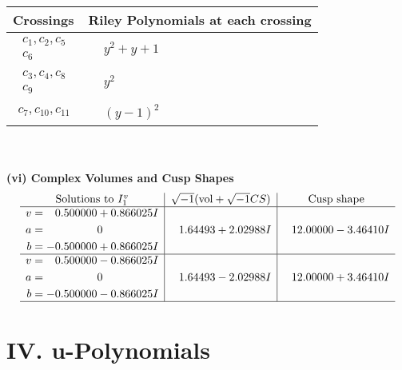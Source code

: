 \documentclass[1p]{elsarticle_modified}
\theoremstyle{definition}
\newcommand{\I}{\sqrt{-1}}
\begin{document}
\begin{tabular}{m{50pt}|m{274pt}}
Crossings & \hspace{64pt}Riley Polynomials at each crossing \\
\hline $$\begin{aligned}c_{1},c_{2},c_{5}\\c_{6}\end{aligned}$$&$\begin{aligned}
&y^2+y+1
\end{aligned}$\\
\hline $$\begin{aligned}c_{3},c_{4},c_{8}\\c_{9}\end{aligned}$$&$\begin{aligned}
&y^2
\end{aligned}$\\
\hline $$\begin{aligned}c_{7},c_{10},c_{11}\end{aligned}$$&$\begin{aligned}
&(y-1)^2
\end{aligned}$\\
\hline
\end{tabular}\\~\\
\newpage\flushleft \textbf{(vi) Complex Volumes and Cusp Shapes}
$$\begin{array}{c|c|c}  
\text{Solutions to }I^v_{1}& \I (\text{vol} + \sqrt{-1}CS) & \text{Cusp shape}\\
 \hline 
\begin{aligned}
v &= \phantom{-}0.500000 + 0.866025 I \\
a &= \phantom{-0.000000 } 0 \\
b &= -0.500000 + 0.866025 I\end{aligned}
 & \phantom{-}1.64493 + 2.02988 I & \phantom{-}12.00000 - 3.46410 I \\ \hline\begin{aligned}
v &= \phantom{-}0.500000 - 0.866025 I \\
a &= \phantom{-0.000000 } 0 \\
b &= -0.500000 - 0.866025 I\end{aligned}
 & \phantom{-}1.64493 - 2.02988 I & \phantom{-}12.00000 + 3.46410 I\\
 \hline 
 \end{array}$$\newpage
\newpage\renewcommand{\arraystretch}{1}
\centering \section*{ IV. u-Polynomials}
\end{document}
